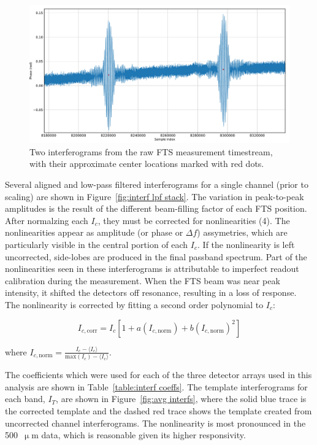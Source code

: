 \begin{figure}[!htbp]
\centering
\includegraphics[width=\textwidth]{figures/blast_data/fts/two_interf_zoom_2}
\caption[~Two interferograms from the raw FTS measurement timestream.]{Two interferograms from the raw FTS measurement timestream, with their approximate center locations marked with red dots.}
\label{fig:interf zoom}
\end{figure}

Several aligned and low-pass filtered interferograms for a single channel (prior to scaling) are shown in Figure~\ref{fig:interf lpf stack}. The variation in peak-to-peak amplitudes is the result of the different beam-filling factor of each FTS position. After normalzing each $I_{c}$, they must be corrected for nonlinearities (4). The nonlinearities appear as amplitude (or phase or $\Delta f$) assymetries, which are particularly visible in the central portion of each $I_{c}$. If the nonlinearity is left uncorrected, side-lobes are produced in the final passband spectrum. Part of the nonlinearities seen in these interferograms is attributable to imperfect readout calibration during the measurement. When the FTS beam was near peak intensity, it shifted the detectors off resonance, resulting in a loss of response. The nonlinearity is corrected by fitting a second order polynomial to $I_{c}$:

\begin{equation}
  I_{c,\mathrm{corr}} = I_{c} \left[ 1 + a(I_{c,\mathrm{norm}}) + b(I_{c,\mathrm{norm}})^{2} \right]
\end{equation}

where $ I_{c,\mathrm{norm}} = \frac{ I_{c} - \langle I_{c} \rangle }{ \mathrm{max}(I_{c}) - \langle I_{c} \rangle }$.

The coefficients which were used for each of the three detector arrays used in this analysis are shown in Table~\ref{table:interf coeffs}. The template interferograms for each band, $I_{T}$, are shown in Figure~\ref{fig:avg interfs}, where the solid blue trace is the corrected template and the dashed red trace shows the template created from uncorrected channel interferograms. The nonlinearity is most pronounced in the 500~$\upmu$m data, which is reasonable given its higher responsivity.

